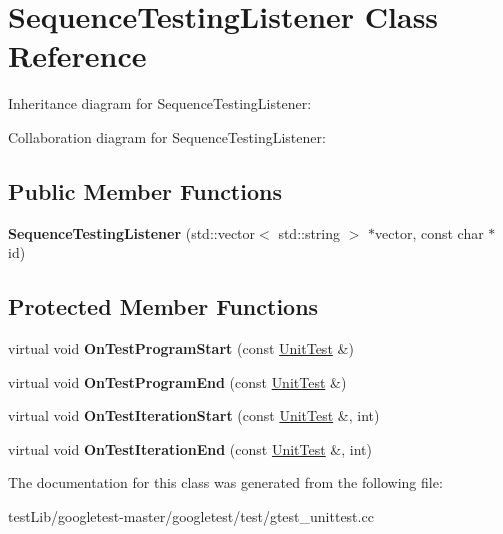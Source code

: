 \hypertarget{classSequenceTestingListener}{}\section{Sequence\+Testing\+Listener Class Reference}
\label{classSequenceTestingListener}


Inheritance diagram for Sequence\+Testing\+Listener\+:


Collaboration diagram for Sequence\+Testing\+Listener\+:
\subsection*{Public Member Functions}
\begin{DoxyCompactItemize}
\item 
\mbox{\label{classSequenceTestingListener_ac0fcb350d20876f8273621ad4c79ba7a}} 
{\bfseries Sequence\+Testing\+Listener} (std\+::vector$<$ std\+::string $>$ $\ast$vector, const char $\ast$id)
\end{DoxyCompactItemize}
\subsection*{Protected Member Functions}
\begin{DoxyCompactItemize}
\item 
\mbox{\label{classSequenceTestingListener_a25b96acdbaa6f582e583e6b56bd39b42}} 
virtual void {\bfseries On\+Test\+Program\+Start} (const \hyperlink{classtesting_1_1UnitTest}{Unit\+Test} \&)
\item 
\mbox{\label{classSequenceTestingListener_aacac5e15bac089460841ff63a5c31f57}} 
virtual void {\bfseries On\+Test\+Program\+End} (const \hyperlink{classtesting_1_1UnitTest}{Unit\+Test} \&)
\item 
\mbox{\label{classSequenceTestingListener_a345641262fa10cc4b251ac54116db74b}} 
virtual void {\bfseries On\+Test\+Iteration\+Start} (const \hyperlink{classtesting_1_1UnitTest}{Unit\+Test} \&, int)
\item 
\mbox{\label{classSequenceTestingListener_a783bc01e2a95f5bf73bbde4d96832e0f}} 
virtual void {\bfseries On\+Test\+Iteration\+End} (const \hyperlink{classtesting_1_1UnitTest}{Unit\+Test} \&, int)
\end{DoxyCompactItemize}


The documentation for this class was generated from the following file\+:\begin{DoxyCompactItemize}
\item 
test\+Lib/googletest-\/master/googletest/test/gtest\+\_\+unittest.\+cc\end{DoxyCompactItemize}
